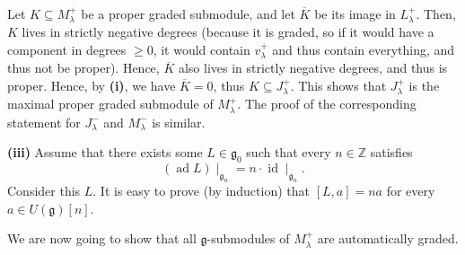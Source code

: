 \documentclass[etingof-lie.tex]{subfiles}
\begin{document}
Let $K\subseteq M_{\lambda}^{+}$ be a proper graded submodule, and let
$\overline{K}$ be its image in $L_{\lambda}^{+}$. Then, $K$ lives in strictly
negative degrees (because it is graded, so if it would have a component in
degrees $\geq0$, it would contain $v_{\lambda}^{+}$ and thus contain
everything, and thus not be proper). Hence, $\overline{K}$ also lives in
strictly negative degrees, and thus is proper. Hence, by \textbf{(i)}, we have
$\overline{K}=0$, thus $K\subseteq J_{\lambda}^{+}$. This shows that
$J_{\lambda}^{+}$ is the maximal proper graded submodule of $M_{\lambda}^{+}$.
The proof of the corresponding statement for $J_{\lambda}^{-}$ and
$M_{\lambda}^{-}$ is similar.

\textbf{(iii)} Assume that there exists some $L\in\mathfrak{g}_{0}$ such that
every $n\in\mathbb{Z}$ satisfies
\[
\left(  \operatorname*{ad}L\right)  \mid_{\mathfrak{g}_{n}}=n\cdot
\operatorname*{id}\mid_{\mathfrak{g}_{n}}.
\]
Consider this $L$. It is easy to prove (by induction) that $\left[
L,a\right]  =na$ for every $a\in U\left(  \mathfrak{g}\right)  \left[
n\right]  $.

We are now going to show that all $\mathfrak{g}$-submodules of $M_{\lambda
}^{+}$ are automatically graded.
\end{document}
